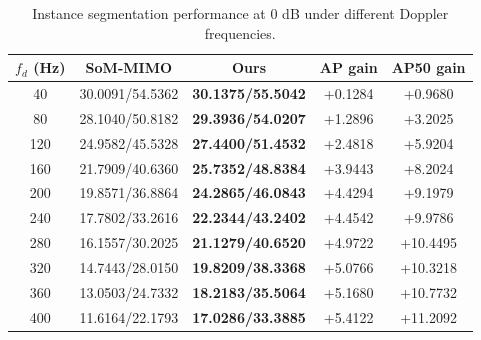 \begin{table}[t]
\centering
\caption{Instance segmentation performance at 0 dB under different Doppler frequencies.}
\label{tab:main_doppler}
\begin{tabular}{c|cc|cc}
\hline
$f_d$ (Hz) & SoM-MIMO & Ours & AP gain & AP50 gain \\
\hline
40 & 30.0091/54.5362 & \textbf{30.1375/55.5042} & +0.1284 & +0.9680 \\ 
80 & 28.1040/50.8182 & \textbf{29.3936/54.0207} & +1.2896 & +3.2025 \\ 
120 & 24.9582/45.5328 & \textbf{27.4400/51.4532} & +2.4818 & +5.9204 \\ 
160 & 21.7909/40.6360 & \textbf{25.7352/48.8384} & +3.9443 & +8.2024 \\ 
200 & 19.8571/36.8864 & \textbf{24.2865/46.0843} & +4.4294 & +9.1979 \\ 
240 & 17.7802/33.2616 & \textbf{22.2344/43.2402} & +4.4542 & +9.9786 \\ 
280 & 16.1557/30.2025 & \textbf{21.1279/40.6520} & +4.9722 & +10.4495 \\ 
320 & 14.7443/28.0150 & \textbf{19.8209/38.3368} & +5.0766 & +10.3218 \\ 
360 & 13.0503/24.7332 & \textbf{18.2183/35.5064} & +5.1680 & +10.7732 \\ 
400 & 11.6164/22.1793 & \textbf{17.0286/33.3885} & +5.4122 & +11.2092 \\ 
\hline
\end{tabular}
\end{table}
